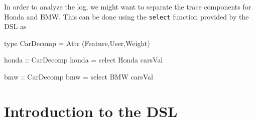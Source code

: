 \documentclass{jfp}
\newcommand{\prog}[1]{\texttt{#1}}
\begin{document}
In order to analyze the log, we might want to separate the trace components for Honda and BMW. This can be done using the \prog{select} function provided by the DSL as


\begin{haskellcode}
type CarDecomp = Attr (Feature,User,Weight)

honda :: CarDecomp
honda = select Honda carsVal

bmw :: CarDecomp
bmw = select BMW carsVal
\end{haskellcode}

\section{Introduction to the DSL}


\end{document}
